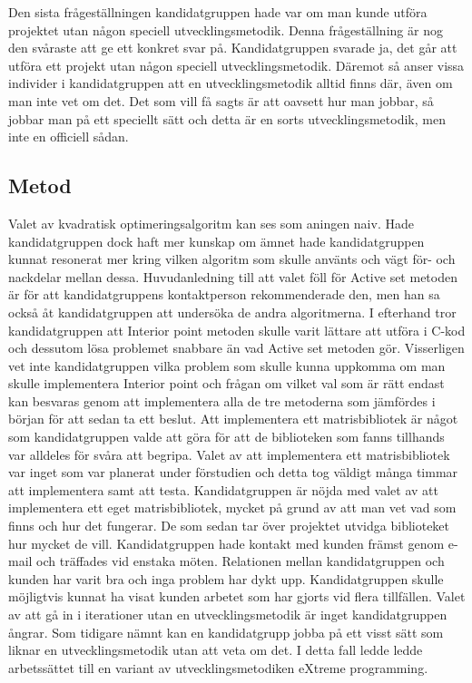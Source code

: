 \newline
\newline
Den sista frågeställningen kandidatgruppen hade var om man kunde utföra projektet utan någon speciell utvecklingsmetodik. Denna frågeställning är nog den svåraste att ge ett konkret svar på. Kandidatgruppen svarade ja, det går att utföra ett projekt utan någon speciell utvecklingsmetodik. Däremot så anser vissa individer i kandidatgruppen att en utvecklingsmetodik alltid finns där, även om man inte vet om det. Det som vill få sagts är att oavsett hur man jobbar, så jobbar man på ett speciellt sätt och detta är en sorts utvecklingsmetodik, men inte en officiell sådan.

\subsection{Metod}
Valet av kvadratisk optimeringsalgoritm kan ses som aningen naiv. Hade kandidatgruppen dock haft mer kunskap om ämnet hade kandidatgruppen kunnat resonerat mer kring vilken algoritm som skulle använts och vägt för- och nackdelar mellan dessa. Huvudanledning till att valet föll för Active set metoden är för att kandidatgruppens kontaktperson rekommenderade den, men han sa också åt kandidatgruppen att undersöka de andra algoritmerna. I efterhand tror kandidatgruppen att Interior point metoden skulle varit lättare att utföra i C-kod och dessutom lösa problemet snabbare än vad Active set metoden gör. Visserligen vet inte kandidatgruppen vilka problem som skulle kunna uppkomma om man skulle implementera Interior point och frågan om vilket val som är rätt endast kan besvaras genom att implementera alla de tre metoderna som jämfördes i början för att sedan ta ett beslut.
\newline
\newline
Att implementera ett matrisbibliotek är något som kandidatgruppen valde att göra för att de biblioteken som fanns tillhands var alldeles för svåra att begripa. Valet av att implementera ett matrisbibliotek var inget som var planerat under förstudien och detta tog väldigt många timmar att implementera samt att testa. Kandidatgruppen är nöjda med valet av att implementera ett eget matrisbibliotek, mycket på grund av att man vet vad som finns och hur det fungerar. De som sedan tar över projektet utvidga biblioteket hur mycket de vill.
\newline
\newline
Kandidatgruppen hade kontakt med kunden främst genom e-mail och träffades vid enstaka möten. Relationen mellan kandidatgruppen och kunden har varit bra och inga problem har dykt upp. Kandidatgruppen skulle möjligtvis kunnat ha visat kunden arbetet som har gjorts vid flera tillfällen. 
\newline
\newline
Valet av att gå in i iterationer utan en utvecklingsmetodik är inget kandidatgruppen ångrar. Som tidigare nämnt kan en kandidatgrupp jobba på ett visst sätt som liknar en utvecklingsmetodik utan att veta om det. I detta fall ledde ledde arbetssättet till en variant av utvecklingsmetodiken eXtreme programming.

